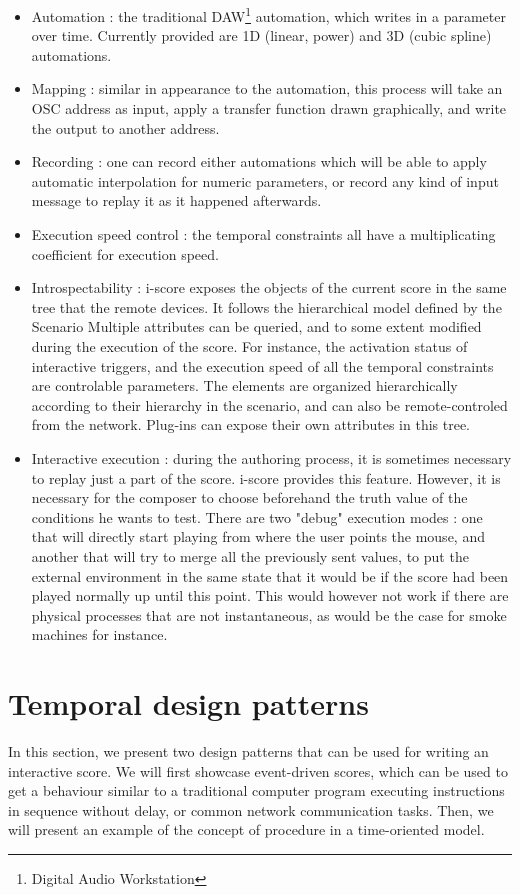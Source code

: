 \documentclass{article}
\begin{document}
\begin{itemize}
\item Automation : the traditional DAW\footnote{Digital Audio Workstation} automation, which writes in a parameter over time. 
Currently provided are 1D (linear, power) and 3D (cubic spline) automations.
\item Mapping : similar in appearance to the automation, this process will take an OSC address as input, apply a transfer function drawn graphically, and write the output to another address.
\item Recording : one can record either automations which will be able to apply automatic interpolation for numeric parameters, or record any kind of input message to replay it as it happened afterwards.
\item Execution speed control : the temporal constraints all have a multiplicating coefficient for execution speed.
\item Introspectability : i-score exposes the objects of the current score in the same tree that the remote devices. 
It follows the hierarchical model defined by the Scenario
Multiple attributes can be queried, and to some extent modified during the execution of the score. 
For instance, the activation status of interactive triggers, and the execution speed of all the temporal constraints are controlable parameters.
The elements are organized hierarchically according to their hierarchy in the scenario, and can also be remote-controled from the network.
Plug-ins can expose their own attributes in this tree.
\item Interactive execution : during the authoring process, it is sometimes necessary to replay just a part of the score.
i-score provides this feature. 
However, it is necessary for the composer to choose beforehand the truth value of the conditions he wants to test.
There are two "debug" execution modes : one that will directly start playing from where the user points the mouse, and another that will try to merge all the previously sent values, to put the external environment in the same state that it would be if the score had been played normally up until this point. 
This would however not work if there are physical processes that are not instantaneous, as would be the case for smoke machines for instance.
\end{itemize}

\section{Temporal design patterns}
In this section, we present two design patterns that can be used 
for writing an interactive score.
We will first showcase event-driven scores, which can be used to get a behaviour 
similar to a traditional computer program executing instructions in sequence without delay, or common network communication tasks.
Then, we will present an example of the concept of procedure in a time-oriented model.
\end{document}
